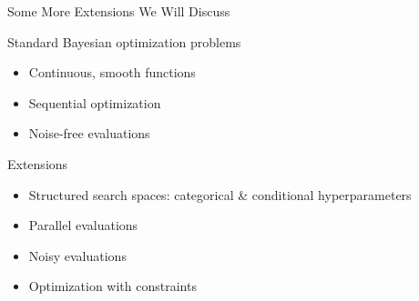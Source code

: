\subtitle{Extensions to Bayesian Optimization}

\maketitle
	
\begin{frame}{Some More Extensions We Will Discuss}
\begin{block}{Standard Bayesian optimization problems}
\begin{itemize}
    \item Continuous, smooth functions
    \item Sequential optimization
    \item Noise-free evaluations
\end{itemize}
\end{block}
\begin{block}{Extensions}
\begin{itemize}
    \item Structured search spaces: categorical \& conditional hyperparameters 
    \item Parallel evaluations
    \item Noisy evaluations
    \item Optimization with constraints
\end{itemize}
\end{block}    
\end{frame}

